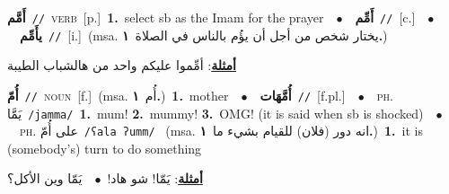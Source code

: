 \documentclass[10pt,a4paper,twoside]{article} %
\begin{document}
\begin{multicols}{2}
{\setlength\topsep{0pt}\textbf{\foreignlanguage{arabic}{أَمَّم}}\ {\color{gray}\texttt{//}\color{black}}\ \textsc{verb}\ [p.]\ \textbf{1.}~select sb as the Imam for the prayer\ \ $\bullet$\ \ \setlength\topsep{0pt}\textbf{\foreignlanguage{arabic}{أَمِّم}}\ {\color{gray}\texttt{//}\color{black}}\ [c.]\ \ $\bullet$\ \ \setlength\topsep{0pt}\textbf{\foreignlanguage{arabic}{يأَمِّم}}\ {\color{gray}\texttt{//}\color{black}}\ [i.]\ \color{gray}(msa. \foreignlanguage{arabic}{يختار شخص من أجل أن يؤُم بالناس في الصلاة}~\foreignlanguage{arabic}{\textbf{١.}})\color{black}\  \begin{flushright}\color{gray}\foreignlanguage{arabic}{\textbf{\underline{\foreignlanguage{arabic}{أمثلة}}}: أمِّموا عليكم واحد من هالشباب الطيبة}\end{flushright}\color{black}} \vspace{2mm}

{\setlength\topsep{0pt}\textbf{\foreignlanguage{arabic}{أُمّ}}\ {\color{gray}\texttt{//}\color{black}}\ \textsc{noun}\ [f.]\ \color{gray}(msa. \foreignlanguage{arabic}{أُم}~\foreignlanguage{arabic}{\textbf{١.}})\color{black}\ \textbf{1.}~mother\ \ $\bullet$\ \ \setlength\topsep{0pt}\textbf{\foreignlanguage{arabic}{أُمَّهَات}}\ {\color{gray}\texttt{//}\color{black}}\ [f.pl.]\ \ $\bullet$\ \ \textsc{ph.} \color{gray} \foreignlanguage{arabic}{يَمَّا}\color{black}\ {\color{gray}\texttt{/{\sffamily jamma}/}\color{black}}\ \textbf{1.}~mum!  \textbf{2.}~mummy!  \textbf{3.}~OMG! (it is said when sb is shocked)\ \ $\bullet$\ \ \textsc{ph.} \color{gray} \foreignlanguage{arabic}{على أُمّ}\color{black}\ {\color{gray}\texttt{/{\sffamily ʕala ʔumm}/}\color{black}}\ \color{gray} (msa. \foreignlanguage{arabic}{انه دور (فلان) للقيام بشيء ما}~\foreignlanguage{arabic}{\textbf{١.}})\color{black}\ \textbf{1.}~it is (somebody's) turn to do something\  \begin{flushright}\color{gray}\foreignlanguage{arabic}{\textbf{\underline{\foreignlanguage{arabic}{أمثلة}}}: يَمّا! شو هاد!\ $\bullet$\ \  يَمّا وين الأكل؟}\end{flushright}\color{black}} \vspace{2mm}


\end{multicols}
\end{document}
